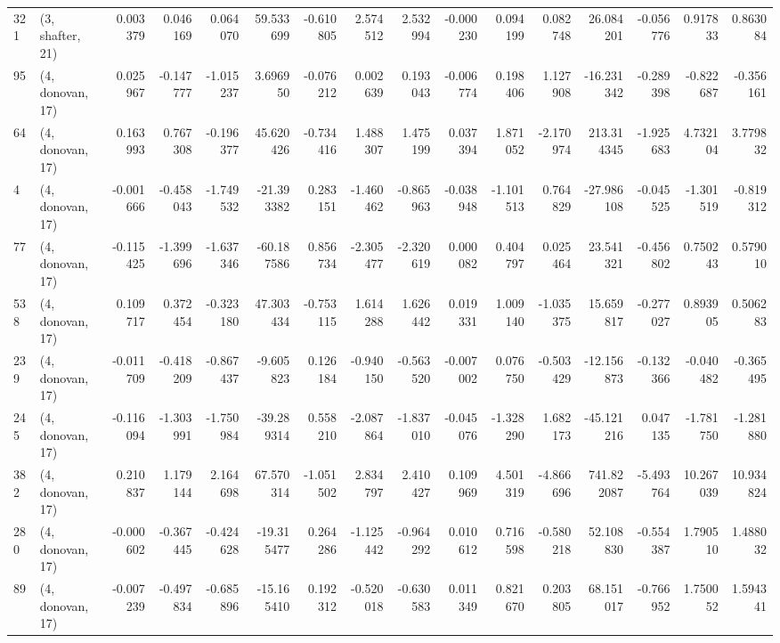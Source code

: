 \begin{tabular}{llrrrrrrrrrrrrrr}
321 &  (3, shafter, 21) &   0.003379 &  0.046169 &  0.064070 &   59.533699 & -0.610805 &   2.574512 &   2.532994 & -0.000230 &  0.094199 &  0.082748 &   26.084201 & -0.056776 &   0.917833 &   0.863084 \\
95  &  (4, donovan, 17) &   0.025967 & -0.147777 & -1.015237 &    3.696950 & -0.076212 &   0.002639 &   0.193043 & -0.006774 &  0.198406 &  1.127908 &  -16.231342 & -0.289398 &  -0.822687 &  -0.356161 \\
64  &  (4, donovan, 17) &   0.163993 &  0.767308 & -0.196377 &   45.620426 & -0.734416 &   1.488307 &   1.475199 &  0.037394 &  1.871052 & -2.170974 &  213.314345 & -1.925683 &   4.732104 &   3.779832 \\
4   &  (4, donovan, 17) &  -0.001666 & -0.458043 & -1.749532 &  -21.393382 &  0.283151 &  -1.460462 &  -0.865963 & -0.038948 & -1.101513 &  0.764829 &  -27.986108 & -0.045525 &  -1.301519 &  -0.819312 \\
77  &  (4, donovan, 17) &  -0.115425 & -1.399696 & -1.637346 &  -60.187586 &  0.856734 &  -2.305477 &  -2.320619 &  0.000082 &  0.404797 &  0.025464 &   23.541321 & -0.456802 &   0.750243 &   0.579010 \\
538 &  (4, donovan, 17) &   0.109717 &  0.372454 & -0.323180 &   47.303434 & -0.753115 &   1.614288 &   1.626442 &  0.019331 &  1.009140 & -1.035375 &   15.659817 & -0.277027 &   0.893905 &   0.506283 \\
239 &  (4, donovan, 17) &  -0.011709 & -0.418209 & -0.867437 &   -9.605823 &  0.126184 &  -0.940150 &  -0.563520 & -0.007002 &  0.076750 & -0.503429 &  -12.156873 & -0.132366 &  -0.040482 &  -0.365495 \\
245 &  (4, donovan, 17) &  -0.116094 & -1.303991 & -1.750984 &  -39.289314 &  0.558210 &  -2.087864 &  -1.837010 & -0.045076 & -1.328290 &  1.682173 &  -45.121216 &  0.047135 &  -1.781750 &  -1.281880 \\
382 &  (4, donovan, 17) &   0.210837 &  1.179144 &  2.164698 &   67.570314 & -1.051502 &   2.834797 &   2.410427 &  0.109969 &  4.501319 & -4.866696 &  741.822087 & -5.493764 &  10.267039 &  10.934824 \\
280 &  (4, donovan, 17) &  -0.000602 & -0.367445 & -0.424628 &  -19.315477 &  0.264286 &  -1.125442 &  -0.964292 &  0.010612 &  0.716598 & -0.580218 &   52.108830 & -0.554387 &   1.790510 &   1.488032 \\
89  &  (4, donovan, 17) &  -0.007239 & -0.497834 & -0.685896 &  -15.165410 &  0.192312 &  -0.520018 &  -0.630583 &  0.011349 &  0.821670 &  0.203805 &   68.151017 & -0.766952 &   1.750052 &   1.594341 \\

\end{tabular}

